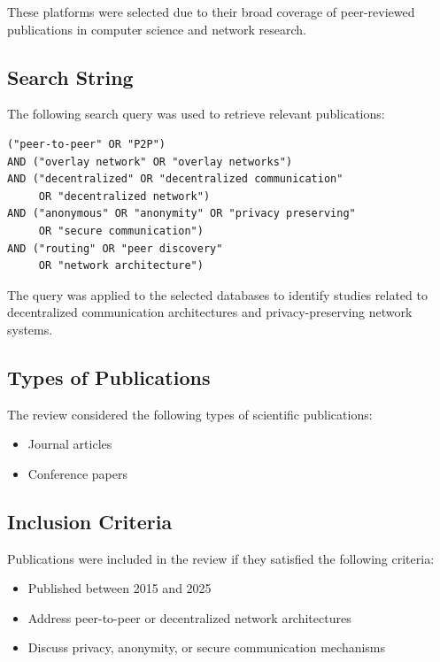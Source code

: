 \documentclass[12pt,a4paper]{article}
\begin{document}
These platforms were selected due to their broad coverage of peer-reviewed publications in computer science and network research.

\subsection{Search String}

The following search query was used to retrieve relevant publications:

\begin{verbatim}
("peer-to-peer" OR "P2P") 
AND ("overlay network" OR "overlay networks") 
AND ("decentralized" OR "decentralized communication"
     OR "decentralized network") 
AND ("anonymous" OR "anonymity" OR "privacy preserving"
     OR "secure communication") 
AND ("routing" OR "peer discovery"
     OR "network architecture")
\end{verbatim}

The query was applied to the selected databases to identify studies related to decentralized communication architectures and privacy-preserving network systems.

\subsection{Types of Publications}

The review considered the following types of scientific publications:

\begin{itemize}
    \item Journal articles
    \item Conference papers
\end{itemize}

\subsection{Inclusion Criteria}

Publications were included in the review if they satisfied the following criteria:

\begin{itemize}
    \item Published between 2015 and 2025
    \item Address peer-to-peer or decentralized network architectures
    \item Discuss privacy, anonymity, or secure communication mechanisms
\end{itemize}
\end{document}
